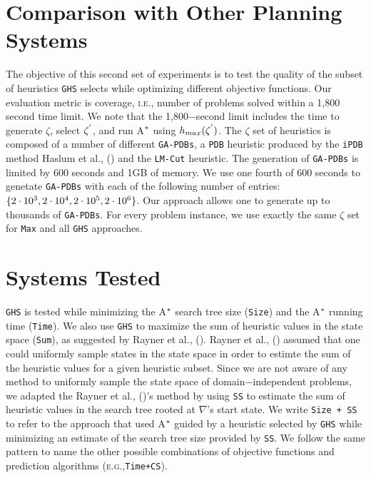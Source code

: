 \section{Comparison with Other Planning Systems}
\noindent
The objective of this second set of experiments is to test the quality of the subset of heuristics \texttt{GHS} selects while optimizing different objective functions. Our evaluation metric is coverage, \textsc{i.e.,} number of problems solved within a 1,800 second time limit. We note that the 1,800$-$second limit includes the time to generate $\zeta$, select $\zeta\sp{'}$, and run A$\sp{*}$ using $h_{max}(\zeta\sp{'})$. The $\zeta$ set of heuristics is composed of a number of different \texttt{GA-PDBs}, a \texttt{PDB} heuristic produced by the \texttt{iPDB} method Haslum et al., (\citeyear{haslum2007domain}) and the \texttt{LM-Cut} heuristic. The generation of \texttt{GA-PDBs} is limited by 600 seconds and 1GB of memory. We use one fourth of 600 seconds to genetate \texttt{GA-PDBs} with each of the following number of entries: $\{2 \cdot 10\sp{3}, 2 \cdot 10\sp{4}, 2 \cdot 10\sp{5}, 2 \cdot 10\sp{6}\}$. Our approach allows one to generate up to thousands of \texttt{GA-PDBs}. For every problem instance, we use exactly the same $\zeta$ set for \texttt{Max} and all \texttt{GHS} approaches.

\section{Systems Tested}
\noindent
\texttt{GHS} is tested while minimizing the A$\sp{*}$ search tree size (\texttt{Size}) and the A$\sp{*}$ running time (\texttt{Time}). We also use \texttt{GHS} to maximize the sum of heuristic values in the state space (\texttt{Sum}), as suggested by Rayner et al., (\citeyear{raynersss13}). Rayner et al., (\citeyear{raynersss13}) assumed that one could uniformly sample states in the state space in order to estimte the sum of the heuristic values for a given heuristic subset. Since we are not aware of any method to uniformly sample the state space of domain$-$independent problems, we adapted the Rayner et al., (\citeyear{raynersss13})'s method by using \texttt{SS} to estimate the sum of heuristic values in the search tree rooted at $\nabla$'s start state. We write \texttt{Size + SS} to refer to the approach that used A$\sp{*}$ guided by a heuristic selected by \texttt{GHS} while minimizing an estimate of the search tree size provided by \texttt{SS}. We follow the same pattern to name the other possible combinations of objective functions and prediction algorithms (\textsc{e.g.,}\texttt{Time+CS}).

